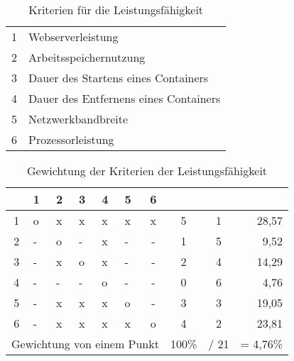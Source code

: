 \begin{table}[ht]
	\small
	\myfloatalign
	\begin{tabularx}{\textwidth}{cX} \hline
		\spacedlowsmallcaps{Nr.} & \spacedlowsmallcaps{Name}\\ \hline 
		1   & Webserverleistung                                  \\
		2   & Arbeitsspeichernutzung                             \\
		3   & Dauer des Startens eines Containers \\
		4   & Dauer des Entfernens eines Containers \\
		5   & Netzwerkbandbreite                                 \\
		6   & Prozessorleistung      \\		\hline
	\end{tabularx}
	\caption{Kriterien für die Leistungsfähigkeit}
	\label{tbl:leistung_nr}
\end{table}

\begin{table}[ht]
	\small
	\myfloatalign
	\begin{tabularx}{\textwidth}{cXXXXXcccr} \hline
		\multicolumn{1}{c|}{} & 1 & 2 & 3 & 4 & 5 & \multicolumn{1}{c|}{6} & \tableheadline{$\sum$} & \tableheadline{Rang} & \spacedlowsmallcaps{Gewichtung {[}\%{]}} \\ \hline 
		\multicolumn{1}{c|}{1} & o & x & x & x & x & \multicolumn{1}{c|}{x} & 5 & 1 & 28,57 \\
		\multicolumn{1}{c|}{2} & - & o & - & x & - & \multicolumn{1}{c|}{-} & 1 & 5 & 9,52 \\
		\multicolumn{1}{c|}{3} & - & x & o & x & - & \multicolumn{1}{c|}{-} & 2 & 4 & 14,29 \\
		\multicolumn{1}{c|}{4} & - & - & - & o & - & \multicolumn{1}{c|}{-} & 0 & 6 & 4,76 \\
		\multicolumn{1}{c|}{5} & - & x & x & x & o & \multicolumn{1}{c|}{-} & 3 & 3 & 19,05 \\
		\multicolumn{1}{c|}{6} & - & x & x & x & x & \multicolumn{1}{c|}{o} & 4 & 2 & 23,81 \\ \hline
		\multicolumn{7}{r}{Gewichtung von einem Punkt}& 100\% & / 21 & = 4,76\%    \\
		\hline
	\end{tabularx}
	\caption{Gewichtung der Kriterien der Leistungsfähigkeit}
	\label{tbl:leistung_gew}
\end{table}

